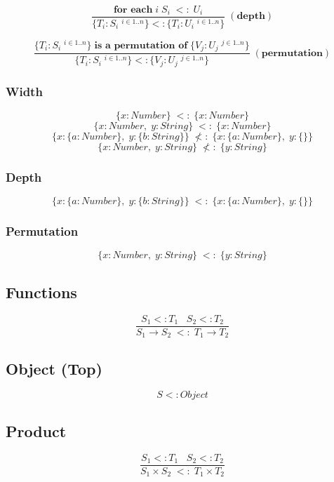 \documentclass[12pt]{article}
\begin{document}
\[
\frac{\textbf{for each} \; i \; S_{i} \; <: \; U_{i}}
     {\{T_{i}:S_{i} \; ^{i \in 1..n}\}
       <:
       \{T_{i}:U_{i} \; ^{i \in 1..n}\}} \; (\textbf{depth})
\]

\[
\frac{\{T_{i}:S_{i} \; ^{i \in 1..n}\} \;
       \textbf{is a permutation of} \;
       \{V_{j}:U_{j} \; ^{j \in 1..n}\}}
     {\{T_{i}:S_{i} \; ^{i \in 1..n}\}
       <:
       \{V_{j}:U_{j} \; ^{j \in 1..n}\}} \; (\textbf{permutation})
\]

\subsubsection{Width}

\[
\{x:Number\} \; <: \; \{x:Number\}
\]
\[
\{x:Number, \; y:String\} \; <: \; \{x:Number\}
\]
\[
\{x:\{a:Number\}, \; y:\{b:String\}\} \;
\not<: \;
\{x:\{a:Number\}, \; y:\{\}\}
\]
\[
\{x:Number, \; y:String\} \; \not<: \; \{y:String\}
\]

\subsubsection{Depth}

\[
\{x:\{a:Number\}, \; y:\{b:String\}\} \;
<: \;
\{x:\{a:Number\}, \; y:\{\}\}
\]

\subsubsection{Permutation}

\[
\{x:Number, \; y:String\} \; <: \; \{y:String\}
\]

\subsection{Functions}

\[
\frac{S_{1} <: T_{1} \;\;\; S_{2} <: T_{2}}
     {S_{1} \rightarrow S_{2} \; <: \; T_{1} \rightarrow T_{2}}
\]

\subsection{Object (Top)}

\[
S <: Object
\]

\subsection{Product}

\[
\frac{S_{1} <: T_{1} \;\;\; S_{2} <: T_{2}}
     {S_{1} \times S_{2} \; <: \; T_{1} \times T_{2}}
\]
\end{document}
